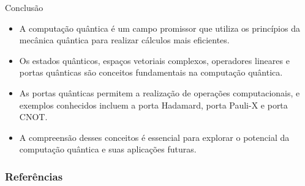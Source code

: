 	\begin{frame}{Conclusão}
		\begin{itemize}
			\item A computação quântica é um campo promissor que utiliza os princípios da mecânica quântica para realizar cálculos mais eficientes.
			\item Os estados quânticos, espaços vetoriais complexos, operadores lineares e portas quânticas são conceitos fundamentais na computação quântica.
			\item As portas quânticas permitem a realização de operações computacionais, e exemplos conhecidos incluem a porta Hadamard, porta Pauli-X e porta CNOT.
			\item A compreensão desses conceitos é essencial para explorar o potencial da computação quântica e suas aplicações futuras.
		\end{itemize}
	\end{frame}
	
	\begin{frame}[allowframebreaks]
		\frametitle{Referências}
		
	\end{frame}
	
